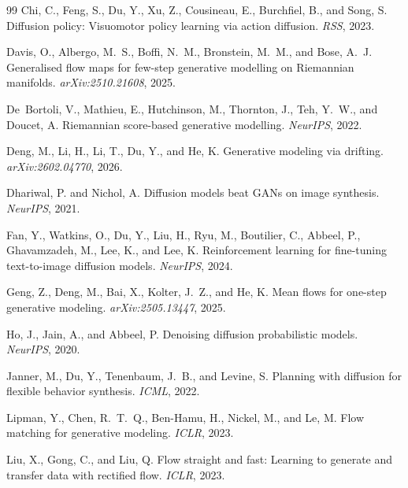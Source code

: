 \documentclass[11pt]{article}
\begin{document}
\begin{thebibliography}{99}
Chi, C., Feng, S., Du, Y., Xu, Z., Cousineau, E., Burchfiel, B., and Song, S.
\newblock Diffusion policy: Visuomotor policy learning via action diffusion.
\newblock \emph{RSS}, 2023.

Davis, O., Albergo, M.~S., Boffi, N.~M., Bronstein, M.~M., and Bose, A.~J.
\newblock Generalised flow maps for few-step generative modelling on {R}iemannian manifolds.
\newblock \emph{arXiv:2510.21608}, 2025.

De~Bortoli, V., Mathieu, E., Hutchinson, M., Thornton, J., Teh, Y.~W., and Doucet, A.
\newblock Riemannian score-based generative modelling.
\newblock \emph{NeurIPS}, 2022.

Deng, M., Li, H., Li, T., Du, Y., and He, K.
\newblock Generative modeling via drifting.
\newblock \emph{arXiv:2602.04770}, 2026.

Dhariwal, P. and Nichol, A.
\newblock Diffusion models beat {GAN}s on image synthesis.
\newblock \emph{NeurIPS}, 2021.

Fan, Y., Watkins, O., Du, Y., Liu, H., Ryu, M., Boutilier, C., Abbeel, P., Ghavamzadeh, M., Lee, K., and Lee, K.
\newblock Reinforcement learning for fine-tuning text-to-image diffusion models.
\newblock \emph{NeurIPS}, 2024.

Geng, Z., Deng, M., Bai, X., Kolter, J.~Z., and He, K.
\newblock Mean flows for one-step generative modeling.
\newblock \emph{arXiv:2505.13447}, 2025.

Ho, J., Jain, A., and Abbeel, P.
\newblock Denoising diffusion probabilistic models.
\newblock \emph{NeurIPS}, 2020.

Janner, M., Du, Y., Tenenbaum, J.~B., and Levine, S.
\newblock Planning with diffusion for flexible behavior synthesis.
\newblock \emph{ICML}, 2022.

Lipman, Y., Chen, R.~T.~Q., Ben-Hamu, H., Nickel, M., and Le, M.
\newblock Flow matching for generative modeling.
\newblock \emph{ICLR}, 2023.

Liu, X., Gong, C., and Liu, Q.
\newblock Flow straight and fast: Learning to generate and transfer data with rectified flow.
\newblock \emph{ICLR}, 2023.


\end{thebibliography}
\end{document}
